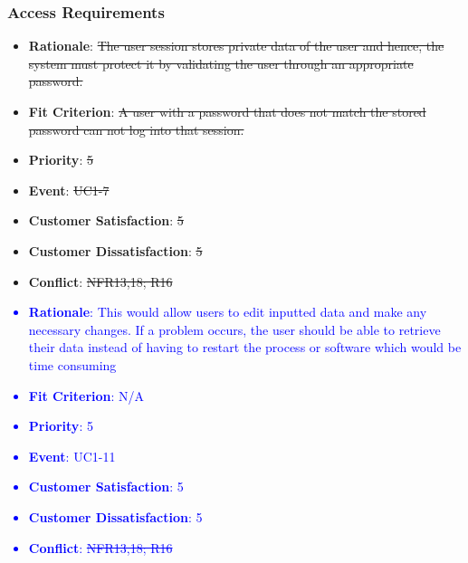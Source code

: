 \documentclass[12pt, titlepage]{article}
\newcounter{reqnum} %
\newcounter{freqnum} %
\begin{document}
\begin{itemize}
\subsubsection{Access Requirements}
\item[\sout{NFR17}
\label{NFR}:] 
\begin{itemize}
    \item \textbf{Rationale}: \sout{The user session stores private data of the user and hence, the system must protect it by validating the user through an appropriate password.}
    \item \textbf{Fit Criterion}: \sout{A user with a password that does not match the stored password can not log into that session.}
    \item \textbf{Priority}: \sout{5}
    \item \textbf{Event}: \sout{UC1-7}%
    \item \textbf{Customer Satisfaction}: \sout{5}
    \item \textbf{Customer Dissatisfaction}: \sout{5}
    \item \textbf{Conflict}: \sout{NFR13,18; R16}
\end{itemize}
\textcolor{blue}{
\item[NFR\refstepcounter{freqnum}\thefreqnum
\label{NFR}:] 
\begin{itemize}
    \item \textbf{Rationale}: This would allow users to edit inputted data and make any necessary changes. If a problem occurs, the user should be able to retrieve their data instead of having to restart the process or software which would be time consuming
    \item \textbf{Fit Criterion}: N/A
    \item \textbf{Priority}: 5
    \item \textbf{Event}: UC1-11%
    \item \textbf{Customer Satisfaction}: 5
    \item \textbf{Customer Dissatisfaction}: 5
    \item \textbf{Conflict}: \sout{NFR13,18; R16}
\end{itemize}
}
\textcolor{blue}{
\item[NFR\refstepcounter{freqnum}\thefreqnum
\label{NFR}:] 
}
\end{itemize}
\end{document}
